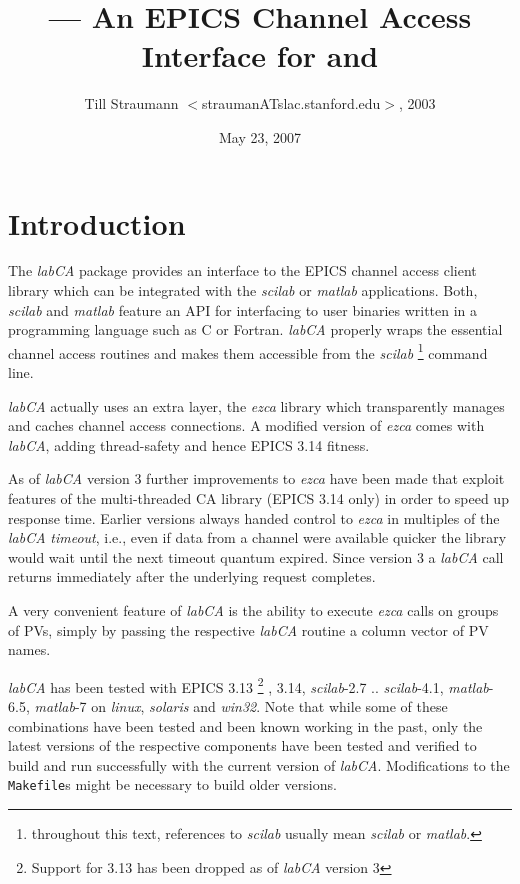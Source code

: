 \documentclass{article}
\title{\sca{} --- An EPICS Channel Access Interface for \scilab{} and \matlab{}}
\author{Till Straumann $<$straumanATslac.stanford.edu$>$, 2003}
\date{May 23, 2007}
\newcommand{\sca}{\ita{labCA}}
\newcommand{\scilab}{\ita{scilab}}
\newcommand{\matlab}{\ita{matlab}}
\newcommand{\windoze}{\ita{win32}}
\newcommand{\ezca}{\ita{ezca}}
\newcommand{\com}[1]{{\tt #1}}
\newcommand{\ita}[1]{\emph{#1}}
\begin{document}
\maketitle
{\hspace*{\fill}{\small\verb$Id: manual.tex,v 1.34 2007/06/01 04:46:40 guest Exp $}\hspace*{\fill}}
\section{Introduction}
The \sca{} package provides an interface to the
EPICS channel access client library which can be
integrated with the \scilab{} or \matlab{} applications.
Both, \scilab{} and \matlab{} feature an API for interfacing
to user binaries written in a programming language such
as C or Fortran. \sca{} properly wraps the essential
channel access routines and makes them accessible
from the \scilab%
\footnote{throughout this text, references to \scilab{}
usually mean \scilab{} or \matlab.}
command line.

\sca{} actually uses an extra layer, the \ezca{} library
which transparently manages and caches channel access 
connections. A modified version of \ezca{} comes with
\sca, adding thread-safety and hence EPICS 3.14 fitness.

As of \sca{} version 3 further improvements to \ezca{}
have been made that exploit features of the multi-threaded
CA library (EPICS 3.14 only) in order to speed up response time.
Earlier versions always handed control to \ezca{} in multiples of the
\sca{} \ita{timeout}, i.e., even if data from a channel
were available quicker the library would wait until the
next timeout quantum expired. Since version 3 a \sca{}
call returns immediately after the underlying request
completes.

A very convenient feature of \sca{} is the ability
to execute \ezca{} calls on groups of PVs, simply by
passing the respective \sca{} routine a column vector
of PV names.

\sca{} has been tested with EPICS 3.13%
\footnote{Support for 3.13 has been dropped as of \sca{} version 3}%
,
3.14, \scilab-2.7 .. \scilab-4.1,
\matlab-6.5, \matlab-7 on \ita{linux}, \ita{solaris} and
\windoze. Note that while some of these combinations have been
tested and been known working in the past, only the latest
versions of the respective components have been tested
and verified to build and run successfully with the
current version of \sca{}. Modifications to the \com{Makefile}s
might be necessary to build older versions.
\end{document}
